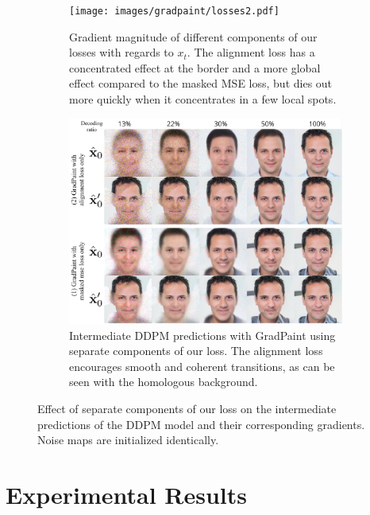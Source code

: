 \begin{figure}[htbp]
  \begin{subfigure}[b]{0.50\linewidth}
    \texttt{[image: images/gradpaint/losses2.pdf]}
    \caption{Gradient magnitude of different components of our losses with regards to $x_t$. The alignment loss has a concentrated effect at the border and a more global effect compared to the masked MSE loss, but dies out more quickly when it concentrates in a few local spots.}
    \label{fig:loss_intuition-grad}
  \end{subfigure}
  \hfill %
  \hspace{0.3cm}
  \begin{subfigure}[b]{0.45\linewidth}
  \centering
    \includegraphics[width=0.8\linewidth]{images/gradpaint/losses1.pdf}
    \caption{Intermediate DDPM predictions with GradPaint using separate components of our loss. The alignment loss encourages smooth and coherent transitions, as can be seen with the homologous background.}
    \label{fig:loss_intuition-int}
  \end{subfigure}
  \caption{Effect of separate components of our loss on the intermediate predictions of the DDPM model and their corresponding gradients. Noise maps are initialized identically.}
  \label{fig:loss_intuition}
\end{figure}





\section{Experimental Results}

